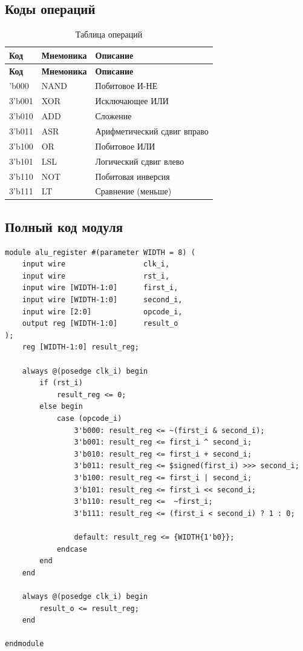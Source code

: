 \documentclass[a4paper,12pt]{article}
\begin{document}
\subsection{Коды операций}
\begin{longtable}{|l|l|l|}
\caption{Таблица операций}\\
\hline
\textbf{Код} & \textbf{Мнемоника} & \textbf{Описание} \\ \hline
\endfirsthead
\hline
\textbf{Код} & \textbf{Мнемоника} & \textbf{Описание} \\ \hline
\endhead
\hline
\endfoot
3'b000 & NAND & Побитовое И-НЕ \\ \hline
3'b001 & XOR & Исключающее ИЛИ \\ \hline
3'b010 & ADD & Сложение \\ \hline
3'b011 & ASR & Арифметический сдвиг вправо \\ \hline
3'b100 & OR & Побитовое ИЛИ \\ \hline
3'b101 & LSL & Логический сдвиг влево \\ \hline
3'b110 & NOT & Побитовая инверсия \\ \hline
3'b111 & LT & Сравнение (меньше) \\ \hline
\end{longtable}

\subsection{Полный код модуля}
\begin{lstlisting}[style=verilog, caption=Реализация модуля ALU]
module alu_register #(parameter WIDTH = 8) (
    input wire                  clk_i,
    input wire                  rst_i,
    input wire [WIDTH-1:0]      first_i,
    input wire [WIDTH-1:0]      second_i,
    input wire [2:0]            opcode_i,
    output reg [WIDTH-1:0]      result_o
);
    reg [WIDTH-1:0] result_reg;

    always @(posedge clk_i) begin
        if (rst_i)
            result_reg <= 0;
        else begin
            case (opcode_i)
                3'b000: result_reg <= ~(first_i & second_i);
                3'b001: result_reg <= first_i ^ second_i;
                3'b010: result_reg <= first_i + second_i;
                3'b011: result_reg <= $signed(first_i) >>> second_i;
                3'b100: result_reg <= first_i | second_i;
                3'b101: result_reg <= first_i << second_i;
                3'b110: result_reg <=  ~first_i;
                3'b111: result_reg <= (first_i < second_i) ? 1 : 0;

                default: result_reg <= {WIDTH{1'b0}};
            endcase
        end
    end

    always @(posedge clk_i) begin
        result_o <= result_reg;
    end

endmodule
\end{lstlisting}
\end{document}

